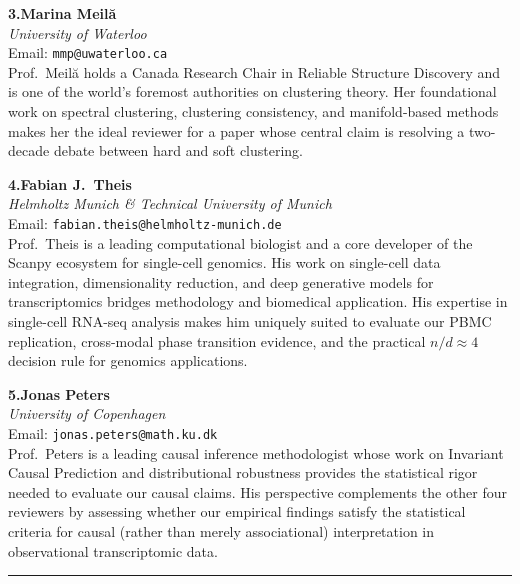 \documentclass[11pt,a4paper]{article}
\begin{document}
\smallskip

\noindent\textbf{3.\quad Marina Meil{\u{a}}}\\
\textit{University of Waterloo}\\[2pt]
Email: \texttt{mmp@uwaterloo.ca}\\[2pt]
Prof.\ Meil{\u{a}} holds a Canada Research Chair in Reliable
Structure Discovery and is one of the world's foremost authorities
on clustering theory. Her foundational work on spectral
clustering, clustering consistency, and manifold-based methods
makes her the ideal reviewer for a paper whose central claim is
resolving a two-decade debate between hard and soft clustering.

\smallskip

\noindent\textbf{4.\quad Fabian J.\ Theis}\\
\textit{Helmholtz Munich \& Technical University of Munich}\\[2pt]
Email: \texttt{fabian.theis@helmholtz-munich.de}\\[2pt]
Prof.\ Theis is a leading computational biologist and a core
developer of the Scanpy ecosystem for single-cell genomics.
His work on single-cell data integration, dimensionality
reduction, and deep generative models for transcriptomics
bridges methodology and biomedical application. His expertise
in single-cell RNA-seq analysis makes him uniquely suited to
evaluate our PBMC replication, cross-modal phase transition
evidence, and the practical $n/d \approx 4$ decision rule
for genomics applications.

\smallskip

\noindent\textbf{5.\quad Jonas Peters}\\
\textit{University of Copenhagen}\\[2pt]
Email: \texttt{jonas.peters@math.ku.dk}\\[2pt]
Prof.\ Peters is a leading causal inference methodologist whose
work on Invariant Causal Prediction and distributional
robustness provides the statistical rigor needed to evaluate our
causal claims. His perspective complements the other four
reviewers by assessing whether our empirical findings satisfy the
statistical criteria for causal (rather than merely
associational) interpretation in observational transcriptomic
data.

\bigskip
\vspace{1em}

\begin{center}
\rule{0.4\textwidth}{0.4pt}
\end{center}
\vspace{0.5em}
\end{document}
